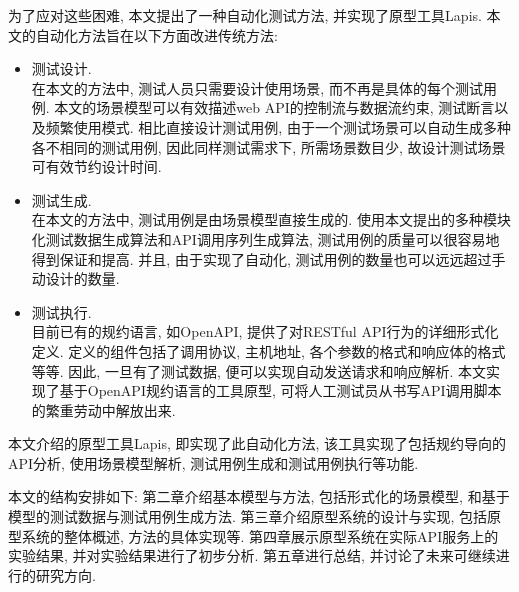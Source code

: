         为了应对这些困难, 本文提出了一种自动化测试方法, 并实现了原型工具Lapis. 本文的自动化方法旨在以下方面改进传统方法:
        \begin{itemize}
            \item 测试设计. \\
                在本文的方法中, 测试人员只需要设计使用场景, 而不再是具体的每个测试用例. 本文的场景模型可以有效描述web API的控制流与数据流约束, 测试断言以及频繁使用模式. 相比直接设计测试用例, 由于一个测试场景可以自动生成多种各不相同的测试用例, 因此同样测试需求下, 所需场景数目少, 故设计测试场景可有效节约设计时间.
            
            \item 测试生成.\\
                在本文的方法中, 测试用例是由场景模型直接生成的. 使用本文提出的多种模块化测试数据生成算法和API调用序列生成算法, 测试用例的质量可以很容易地得到保证和提高. 并且, 由于实现了自动化, 测试用例的数量也可以远远超过手动设计的数量.
            
            \item 测试执行.\\
                目前已有的规约语言, 如OpenAPI, 提供了对RESTful API行为的详细形式化定义. 定义的组件包括了调用协议, 主机地址, 各个参数的格式和响应体的格式等等. 因此, 一旦有了测试数据, 便可以实现自动发送请求和响应解析.  本文实现了基于OpenAPI规约语言的工具原型, 可将人工测试员从书写API调用脚本的繁重劳动中解放出来.
        \end{itemize}
        本文介绍的原型工具Lapis, 即实现了此自动化方法, 该工具实现了包括规约导向的API分析, 使用场景模型解析, 测试用例生成和测试用例执行等功能.
        
        本文的结构安排如下: 第二章介绍基本模型与方法, 包括形式化的场景模型, 和基于模型的测试数据与测试用例生成方法. 第三章介绍原型系统的设计与实现, 包括原型系统的整体概述, 方法的具体实现等. 第四章展示原型系统在实际API服务上的实验结果, 并对实验结果进行了初步分析. 第五章进行总结, 并讨论了未来可继续进行的研究方向.
        
        

